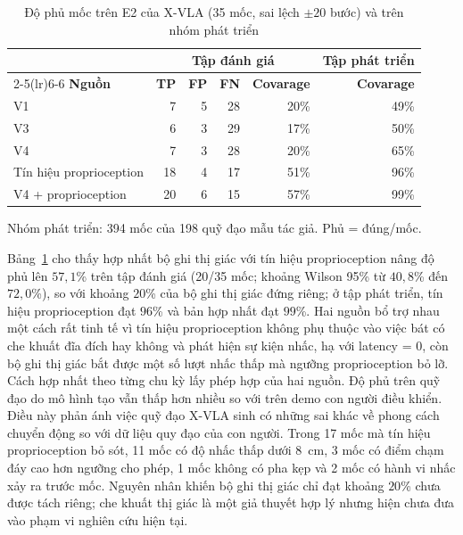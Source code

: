 \begin{table}[htbp]
\centering\small
\caption{Độ phủ mốc trên E2 của X-VLA (35 mốc, sai lệch $\pm 20$ bước) và trên nhóm phát triển}
\label{tab:xvla-writer-recall}
\setlength{\tabcolsep}{4pt}
\begin{tabular}{l|r|r|r|r|r}
\toprule
& \multicolumn{4}{c}{\textbf{Tập đánh giá}} & \textbf{Tập phát triển} \\
\cmidrule(lr){2-5}\cmidrule(lr){6-6}
\textbf{Nguồn} & \textbf{TP} & \textbf{FP} & \textbf{FN} & \textbf{Covarage} & \textbf{Covarage} \\
\midrule
V1 & 7 & 5 & 28 & 20\% & 49\% \\
V3 & 6 & 3 & 29 & 17\% & 50\% \\
V4 & 7 & 3 & 28 & 20\% & 65\% \\
Tín hiệu proprioception & 18 & 4 & 17 & 51\% & 96\% \\
V4 + proprioception  & 20 & 6 & 15 & 57\% & 99\% \\
\bottomrule
\end{tabular}
\par\smallskip
{\footnotesize Nhóm phát triển: 394 mốc của 198 quỹ đạo mẫu tác giả. Phủ = đúng/mốc.\par}
\end{table}

Bảng~\ref{tab:xvla-writer-recall} cho thấy hợp nhất bộ ghi thị giác với tín hiệu proprioception nâng độ phủ lên $57{,}1$\% trên tập đánh giá (20/35 mốc; khoảng Wilson 95\% từ $40{,}8$\% đến $72{,}0$\%), so với khoảng $20$\% của bộ ghi thị giác đứng riêng; ở tập phát triển, tín hiệu proprioception đạt $96$\% và bản hợp nhất đạt $99$\%. Hai nguồn bổ trợ nhau một cách rất tinh tế vì tín hiệu proprioception không phụ thuộc vào việc bát có che khuất đĩa đích hay không và phát hiện sự kiện nhấc, hạ với latency = 0, còn bộ ghi thị giác bắt được một số lượt nhấc thấp mà ngưỡng proprioception bỏ lỡ. Cách hợp nhất theo từng chu kỳ lấy phép hợp của hai nguồn. Độ phủ trên quỹ đạo do mô hình tạo vẫn thấp hơn nhiều so với trên demo con người điều khiển. Điều này phản ánh việc quỹ đạo X-VLA sinh có những sai khác về phong cách chuyển động so với dữ liệu quy đạo của con người. Trong 17 mốc mà tín hiệu proprioception bỏ sót, 11 mốc có độ nhấc thấp dưới 8~cm, 3 mốc có điểm chạm đáy cao hơn ngưỡng cho phép, 1 mốc không có pha kẹp và 2 mốc có hành vi nhấc xảy ra trước mốc. Nguyên nhân khiến bộ ghi thị giác chỉ đạt khoảng $20$\% chưa được tách riêng; che khuất thị giác là một giả thuyết hợp lý nhưng hiện chưa đưa vào phạm vi nghiên cứu hiện tại.

